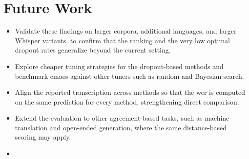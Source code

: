 \section{Future Work}

\begin{itemize}
    \item Validate these findings on larger corpora, additional languages, and larger Whisper variants, to confirm that the ranking and the very low optimal dropout rates generalize beyond the current setting.

    \item Explore cheaper tuning strategies for the dropout-based methods and benchmark \acrshort{cmaes} against other tuners such as random \cite{bergstra2012random} and Bayesian \cite{snoek2012practical} search.

    \item Align the reported transcription across methods so that the \acrshort{wer} is computed on the same prediction for every method, strengthening direct comparison.

    \item Extend the evaluation to other agreement-based tasks, such as machine translation and open-ended generation, where the same distance-based scoring may apply.

    \item {}
\end{itemize}
